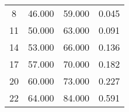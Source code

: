 % 
\begin{tabular}{cccc}
  \hline
  \hline
8 & 46.000 & 59.000 & 0.045 \\ 
  11 & 50.000 & 63.000 & 0.091 \\ 
  14 & 53.000 & 66.000 & 0.136 \\ 
  17 & 57.000 & 70.000 & 0.182 \\ 
  20 & 60.000 & 73.000 & 0.227 \\ 
  22 & 64.000 & 84.000 & 0.591 \\ 
   \hline
\end{tabular}
